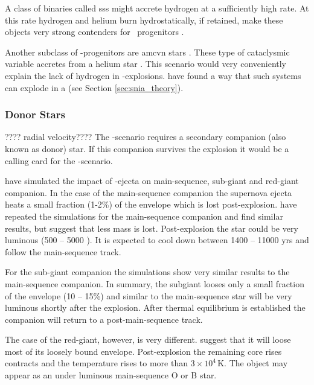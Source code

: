 A class of binaries called \gls{sss} might accrete hydrogen at a sufficiently high rate. At this rate hydrogen and helium burn hydrostatically, if retained, make these objects very strong contenders for \snia\ progenitors \citep[][and references therein]{2006astro.ph..6364D}. 
 
Another subclass of \sd-progenitors are \gls{amcvn} stars \citep{2005ASPC..330...27N}. These type of cataclysmic variable accretes from a helium star \cite{1992A&A...262...97V}. This scenario would very conveniently explain the lack of hydrogen in \snia-explosions. \citet[][]{2010A&A...514A..53F} have found a way that such systems can explode in a \snia (see Section \ref{sec:snia_theory}).


\subsubsection{Donor Stars}

???? radial velocity????
The \sd-scenario requires a secondary companion (also known as donor) star. If this companion survives the explosion it would be a calling card for the \sd-scenario. 

\citet{2000ApJS..128..615M} have simulated the impact of \snia-ejecta on main-sequence, sub-giant and red-giant companion. In the case of the main-sequence companion the supernova ejecta heats a small fraction (1-2\%) of the envelope which is lost post-explosion. \citet{2008A&A...489..943P} have repeated the simulations for the main-sequence companion and find similar results, but suggest that less mass is lost. Post-explosion the star could be very luminous (500 -- 5000 \lsun). It is expected to cool down between 1400 -- 11000 yrs and follow the main-sequence track. 

For the sub-giant companion the simulations show very similar results to the main-sequence companion. In summary, the subgiant looses only a small fraction of the envelope (10 -- 15\%) and similar to the main-sequence star will be very luminous shortly after the explosion. After thermal equilibrium is established the companion will return to a post-main-sequence track. 

The case of the red-giant, however, is very different. \citet{2000ApJS..128..615M} suggest that it will loose most of its loosely bound envelope. Post-explosion the remaining core rises contracts and the temperature rises to more than $3 \times 10^4$\,K. The object may appear as an under luminous main-sequence O or B star. 


